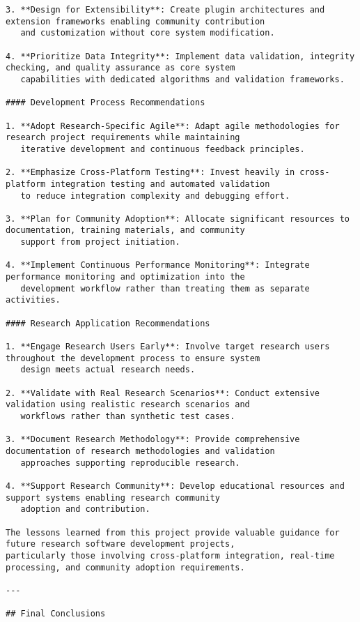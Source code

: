 \documentclass[11pt,a4paper]{report}
\begin{document}
\begin{verbatim}
3. **Design for Extensibility**: Create plugin architectures and extension frameworks enabling community contribution
   and customization without core system modification.

4. **Prioritize Data Integrity**: Implement data validation, integrity checking, and quality assurance as core system
   capabilities with dedicated algorithms and validation frameworks.

#### Development Process Recommendations

1. **Adopt Research-Specific Agile**: Adapt agile methodologies for research project requirements while maintaining
   iterative development and continuous feedback principles.

2. **Emphasize Cross-Platform Testing**: Invest heavily in cross-platform integration testing and automated validation
   to reduce integration complexity and debugging effort.

3. **Plan for Community Adoption**: Allocate significant resources to documentation, training materials, and community
   support from project initiation.

4. **Implement Continuous Performance Monitoring**: Integrate performance monitoring and optimization into the
   development workflow rather than treating them as separate activities.

#### Research Application Recommendations

1. **Engage Research Users Early**: Involve target research users throughout the development process to ensure system
   design meets actual research needs.

2. **Validate with Real Research Scenarios**: Conduct extensive validation using realistic research scenarios and
   workflows rather than synthetic test cases.

3. **Document Research Methodology**: Provide comprehensive documentation of research methodologies and validation
   approaches supporting reproducible research.

4. **Support Research Community**: Develop educational resources and support systems enabling research community
   adoption and contribution.

The lessons learned from this project provide valuable guidance for future research software development projects,
particularly those involving cross-platform integration, real-time processing, and community adoption requirements.

---

## Final Conclusions


\end{verbatim}
\end{document}
